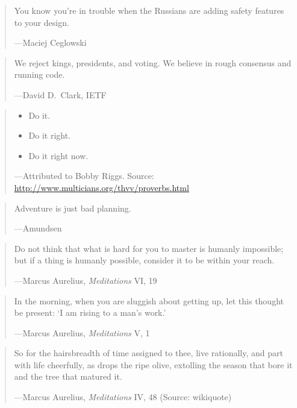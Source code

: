 \documentclass[a4paper]{article}
\begin{document}
\medskip
\begin{quote}
	You know you're in trouble when the Russians are adding safety
	features to your design.

	---Maciej Ceglowski~\citep[note 5]{Ceglowski2005}
\end{quote}

\medskip
\begin{quote}
	We reject kings, presidents, and voting.  We believe in
	rough consensus and running code.

	---David D.~Clark, IETF
\end{quote}

\medskip
\begin{quote}
	\begin{itemize}
		\item Do it.
		\item Do it right.
		\item Do it right now.
	\end{itemize}
	---Attributed to Bobby Riggs.  Source: \url{http://www.multicians.org/thvv/proverbs.html}
\end{quote}

\medskip
\begin{quote}
	Adventure is just bad planning.

	---Amundsen
\end{quote}

\medskip
\begin{quote}
	Do not think that what is hard for you to master is humanly
	impossible; but if a thing is humanly possible, consider it
	to be within your reach.

	---Marcus Aurelius, {\it Meditations} VI, 19
\end{quote}

\medskip
\begin{quote}
	In the morning, when you are sluggish about getting up,
	let this thought be present: `I am rising to a man's work.'

	---Marcus Aurelius, {\it Meditations} V, 1
\end{quote}

\medskip
\begin{quote}
	So for the hairsbreadth of time assigned to thee, live
	rationally, and part with life cheerfully, as drops the
	ripe olive, extolling the season that bore it and the
	tree that matured it.

	---Marcus Aurelius, {\it Meditations} IV, 48 (Source: wikiquote)
\end{quote}
\end{document}
